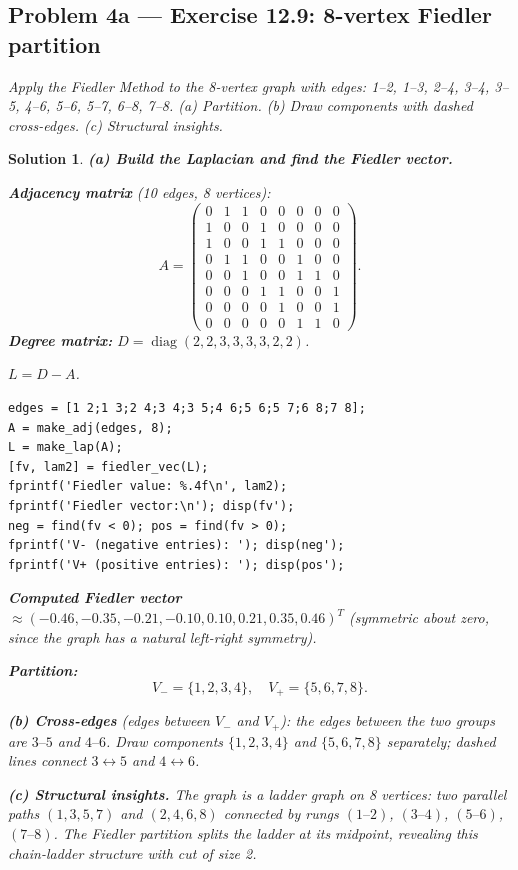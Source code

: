 \documentclass[11pt,a4paper]{article}
\theoremstyle{sol}
\newtheorem*{solution}{Solution}
\begin{document}
\clearpage
\subsection*{Problem 4a --- Exercise 12.9: 8-vertex Fiedler partition}
\textit{Apply the Fiedler Method to the 8-vertex graph with edges:
1--2, 1--3, 2--4, 3--4, 3--5, 4--6, 5--6, 5--7, 6--8, 7--8.
(a) Partition. (b) Draw components with dashed cross-edges. (c) Structural insights.}

\begin{solution}
\textbf{(a) Build the Laplacian and find the Fiedler vector.}

\textbf{Adjacency matrix} (10 edges, 8 vertices):
\[
A = \begin{pmatrix}
0&1&1&0&0&0&0&0\\
1&0&0&1&0&0&0&0\\
1&0&0&1&1&0&0&0\\
0&1&1&0&0&1&0&0\\
0&0&1&0&0&1&1&0\\
0&0&0&1&1&0&0&1\\
0&0&0&0&1&0&0&1\\
0&0&0&0&0&1&1&0
\end{pmatrix}.
\]
\textbf{Degree matrix:} $D=\operatorname{diag}(2,2,3,3,3,3,2,2)$.

$L = D - A$.

\begin{lstlisting}
edges = [1 2;1 3;2 4;3 4;3 5;4 6;5 6;5 7;6 8;7 8];
A = make_adj(edges, 8);
L = make_lap(A);
[fv, lam2] = fiedler_vec(L);
fprintf('Fiedler value: %.4f\n', lam2);
fprintf('Fiedler vector:\n'); disp(fv');
neg = find(fv < 0); pos = find(fv > 0);
fprintf('V- (negative entries): '); disp(neg');
fprintf('V+ (positive entries): '); disp(pos');
\end{lstlisting}

\textbf{Computed Fiedler vector} $\approx(-0.46,-0.35,-0.21,-0.10,0.10,0.21,0.35,0.46)^T$ (symmetric about zero, since the graph has a natural left-right symmetry).

\textbf{Partition:}
\[
V_- = \{1,2,3,4\}, \quad V_+ = \{5,6,7,8\}.
\]

\textbf{(b) Cross-edges} (edges between $V_-$ and $V_+$): the edges between the two groups are $3\text{--}5$ and $4\text{--}6$. Draw components $\{1,2,3,4\}$ and $\{5,6,7,8\}$ separately; dashed lines connect $3\leftrightarrow5$ and $4\leftrightarrow6$.

\textbf{(c) Structural insights.} The graph is a \textit{ladder graph} on 8 vertices: two parallel paths $(1,3,5,7)$ and $(2,4,6,8)$ connected by rungs $(1\text{--}2)$, $(3\text{--}4)$, $(5\text{--}6)$, $(7\text{--}8)$. The Fiedler partition splits the ladder at its midpoint, revealing this chain-ladder structure with cut of size 2.
\end{solution}
\end{document}
